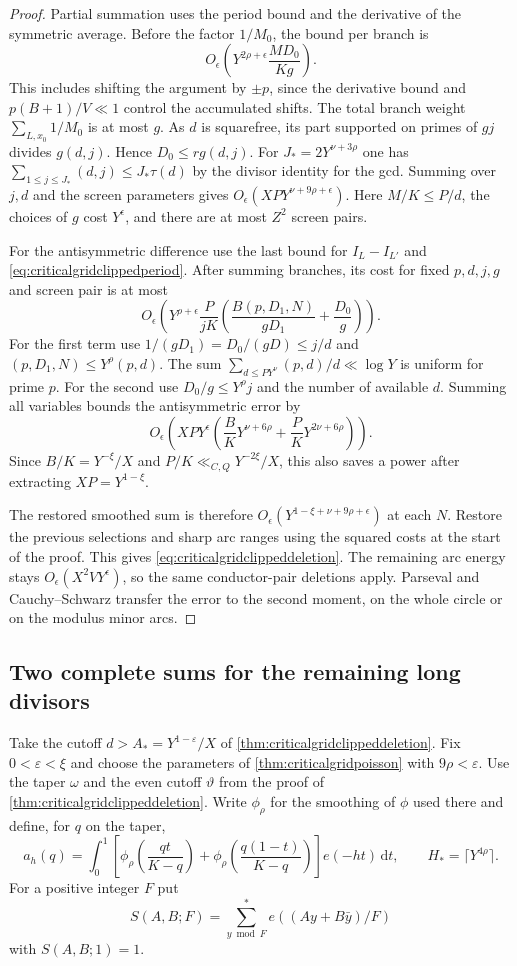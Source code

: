 \documentclass[11pt,a4paper]{article}
\numberwithin{equation}{section}
\newcommand{\ud}{\mathrm d}
\begin{document}
\begin{proof}
Partial summation uses the period bound and the derivative
of the symmetric average. Before the factor $1/M_0$,
the bound per branch is
\[
 O_\epsilon\!\left(Y^{2\rho+\epsilon}\frac{M D_0}{K g}\right).
\]
This includes shifting the argument by $\pm p$,
since the derivative bound and $p(B+1)/V\ll1$
control the accumulated shifts. The total branch weight
$\sum_{L,x_0}1/M_0$ is at most $g$.
As $d$ is squarefree, its part supported on primes of
$g j$ divides $g(d,j)$. Hence $D_0\le r g(d,j)$.
For $J_*=2Y^{\nu+3\rho}$ one has
$\sum_{1\le j\le J_*}(d,j)\le J_*\tau(d)$ by the divisor
identity for the gcd. Summing over $j,d$ and the
screen parameters gives
$O_\epsilon(XP Y^{\nu+9\rho+\epsilon})$.
Here $M/K\le P/d$, the choices of $g$ cost $Y^\epsilon$,
and there are at most $Z^2$ screen pairs.

For the antisymmetric difference use the last bound for
$I_L-I_{L'}$ and \cref{eq:criticalgridclippedperiod}.
After summing branches, its cost for fixed $p,d,j,g$
and screen pair is at most
\[
 O_\epsilon\!\left(
  Y^{\rho+\epsilon}\frac P {jK}
         \left(\frac{B(p,D_1,N)}{gD_1}+\frac{D_0}{g}\right)\right).
\]
For the first term use
$1/(gD_1)=D_0/(gD)\le j/d$ and
$(p,D_1,N)\le Y^\rho(p,d)$.
The sum $\sum_{d\le P Y^\nu}(p,d)/d\ll \log Y$
is uniform for prime $p$. For the second use
$D_0/g\le Y^\rho j$ and the number of available $d$.
Summing all variables bounds the antisymmetric error by
\[
 O_\epsilon\!\left(XP Y^\epsilon
       \left(\frac B K Y^{\nu+6\rho}
                      +\frac P K Y^{2\nu+6\rho}\right)\right).
\]
Since $B/K=Y^{-\xi}/X$ and $P/K\ll_{C,Q} Y^{-2\xi}/X$,
this also saves a power after extracting $XP=Y^{1-\xi}$.

The restored smoothed sum is therefore
$O_\epsilon(Y^{1-\xi+\nu+9\rho+\epsilon})$ at each $N$.
Restore the previous selections and sharp arc ranges
using the squared costs at the start of the proof.
This gives \cref{eq:criticalgridclippeddeletion}.
The remaining arc energy stays $O_\epsilon(X^2 VY^\epsilon)$,
so the same conductor-pair deletions apply. Parseval
and Cauchy--Schwarz transfer the error to the second
moment, on the whole circle or on the modulus minor arcs.
\end{proof}

\clearpage
\subsection{Two complete sums for the remaining long divisors}

Take the cutoff $d>A_*=Y^{1-\varepsilon}/X$ of
\cref{thm:criticalgridclippeddeletion}. Fix
$0<\varepsilon<\xi$ and choose the parameters of
\cref{thm:criticalgridpoisson} with $9\rho<\varepsilon$.
Use the taper $\omega$ and the even cutoff $\vartheta$
from the proof of \cref{thm:criticalgridclippeddeletion}.
Write $\phi_\rho$ for the smoothing of $\phi$ used there
and define, for $q$ on the taper,
\[
 a_h(q)=\int_0^1
   \left[\phi_\rho\!\left(\frac{qt}{K-q}\right)+
         \phi_\rho\!\left(\frac{q(1-t)}{K-q}\right)\right]
   e(-ht)\,\ud t,\qquad H_*=\lceil Y^{4\rho}\rceil.
\]
For a positive integer $F$ put
\[
 S(A,B;F)=\sum_{y\bmod F}^{*}e((Ay+B\bar y)/F)
\]
with $S(A,B;1)=1$.
\end{document}
